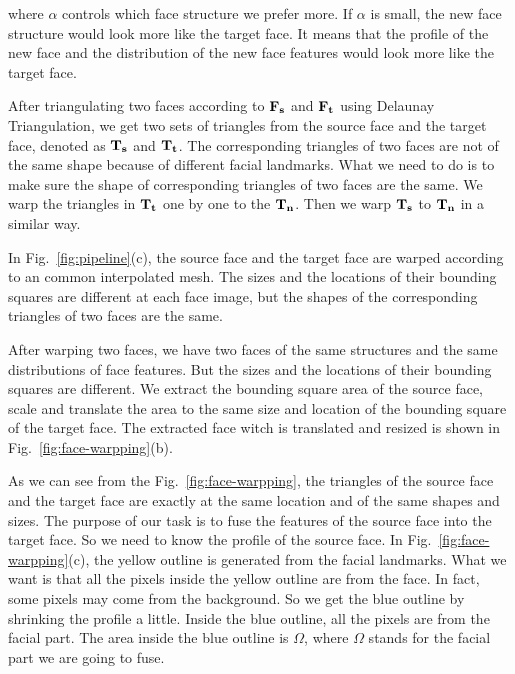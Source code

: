 where $\alpha$ controls which face structure we prefer more. If $\alpha$ is small, the new face structure would look more like the target face. It means that the profile of the new face and the distribution of the new face features would look more like the target face.

After triangulating two faces according to $\mathbf{F_s}$ and $\mathbf{F_t}$ using Delaunay Triangulation, we get two sets of triangles from the source face and the target face, denoted as $\mathbf{T_s}$ and $\mathbf{T_t}$. The corresponding triangles of two faces are not of the same shape because of different facial landmarks. What we need to do is to make sure the shape of corresponding triangles of two faces are the same. We warp the triangles in $\mathbf{T_{t}}$ one by one to the $\mathbf{T_{n}}$. Then we warp $\mathbf{T_s}$ to $\mathbf{T_n}$ in a similar way.

In Fig.~\ref{fig:pipeline}(c), the source face and the target face are warped according to an common interpolated mesh. The sizes and the locations of their bounding squares are different at each face image, but the shapes of the corresponding triangles of two faces are the same.

After warping two faces, we have two faces of the same structures and the same distributions of face features. But the sizes and the locations of their bounding squares are different. We extract the bounding square area of the source face, scale and translate the area to the same size and location of the bounding square of the target face. The extracted face witch is translated and resized is shown in Fig.~\ref{fig:face-warpping}(b).

As we can see from the Fig.~\ref{fig:face-warpping}, the triangles of the source face and the target face are exactly at the same location and of the same shapes and sizes. The purpose of our task is to fuse the features of the source face into the target face. So we need to know the profile of the source face. In Fig.~\ref{fig:face-warpping}(c), the yellow outline is generated from the facial landmarks. What we want is that all the pixels inside the yellow outline are from the face. In fact, some pixels may come from the background. So we get the blue outline by shrinking the profile a little. Inside the blue outline, all the pixels are from the facial part. The area inside the blue outline is $\Omega$, where $\Omega$ stands for the facial part we are going to fuse.

